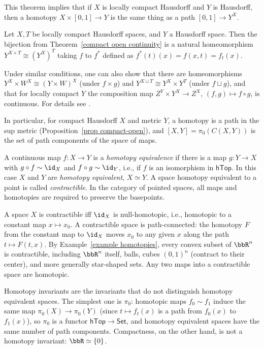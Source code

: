 This theorem implies that if $X$ is locally compact Hausdorff and $Y$ is Hausdorff, then a homotopy $X\times [0,1]\to Y$ is the same thing as a path $[0,1]\to Y^X$.
\begin{cor}\label{cor exponential law}
    Let $X,T$ be locally compact Hausdorff spaces, and $Y$ a Hausdorff space. Then the bijection from Theorem~\ref{compact open continuity} is a natural homeomorphism $Y^{X\times T}\cong \left(Y^X\right)^T$ taking $f$ to $f^\ast$ defined as $f^\ast (t)(x)=f(x,t)=f_t(x)$.
\end{cor}

Under similar conditions, one can also show that there are homeomorphisms $Y^X\times W^X\cong (Y\times W)^X$ (under $f\times g$) and $Y^{X\sqcup T}\cong Y^X\times Y^T$ (under $f\sqcup g$), and that for locally compact $Y$ the composition map $Z^Y\times Y^X \to Z^X$, $(f,g)\mapsto f\circ g$, is continuous. For details see \cite[\S VII.2]{Bredon}.

In particular, for compact Hausdorff $X$ and metric $Y$, a homotopy is a path in the sup metric (Proposition~\ref{prop compact-open}), and $[X,Y]=\pi_0(C(X,Y))$ is the set of path components of the space of maps.

\begin{defn}
    A continuous map $f:X\to Y$ is a \emph{homotopy equivalence} if there is a map $g:Y\to X$ with $g\circ f\sim\id_X$ and $f\circ g\sim\id_Y$, i.e., if $f$ is an isomorphism in $\mathsf{hTop}$. In this case $X$ and $Y$ are \emph{homotopy equivalent}, $X\simeq Y$. A space homotopy equivalent to a point is called \emph{contractible}. In the category of pointed spaces, all maps and homotopies are required to preserve the basepoints.
\end{defn}

A space $X$ is contractible iff $\id_X$ is null-homotopic, i.e., homotopic to a constant map $x\mapsto x_0$. A contractible space is path-connected: the homotopy $F$ from the constant map to $\id_X$ moves $x_0$ to any given $x$ along the path $t\mapsto F(t,x)$. By Example~\ref{example homotopies}, every convex subset of $\bbR^n$ is contractible, including $\bbR^n$ itself, balls, cubes $(0,1)^n$ (contract to their center), and more generally star-shaped sets. Any two maps into a contractible space are homotopic.

Homotopy invariants are the invariants that do not distinguish homotopy equivalent spaces. The simplest one is $\pi_0$: homotopic maps $f_0\sim f_1$ induce the same map $\pi_0(X)\to\pi_0(Y)$ (since $t\mapsto f_t(x)$ is a path from $f_0(x)$ to $f_1(x)$), so $\pi_0$ is a functor $\mathsf{hTop}\to\mathsf{Set}$, and homotopy equivalent spaces have the same number of path components. Compactness, on the other hand, is not a homotopy invariant: $\bbR\simeq\{0\}$.

